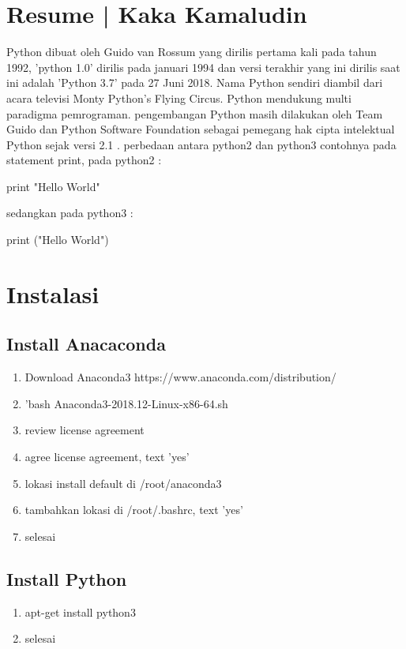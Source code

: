 \section{Resume | Kaka Kamaludin}
\begin{flushleft}
\qquad Python dibuat oleh Guido van Rossum yang dirilis pertama  kali pada tahun 1992, 'python 1.0' dirilis pada januari 1994 dan versi terakhir yang ini dirilis saat ini adalah 'Python 3.7' pada 27 Juni 2018. Nama Python sendiri diambil dari acara televisi Monty Python's Flying Circus. Python mendukung multi paradigma pemrograman. pengembangan Python masih dilakukan oleh Team Guido dan Python Software Foundation sebagai pemegang hak cipta intelektual Python sejak versi 2.1 . perbedaan antara python2 dan python3 contohnya pada statement print, pada python2 : 

print "Hello World"

sedangkan pada python3 :

print ("Hello World")
\end{flushleft}

\section{Instalasi}
\subsection{Install Anacaconda}
\begin{enumerate}
\item Download Anaconda3 https://www.anaconda.com/distribution/
\item 'bash Anaconda3-2018.12-Linux-x86-64.sh
\item review license agreement
\item agree license agreement, text 'yes'
\item lokasi install default di /root/anaconda3
\item tambahkan lokasi di /root/.bashrc, text 'yes'
\item selesai
\end{enumerate}

\subsection{Install Python}
\begin{enumerate}
\item apt-get install python3
\item selesai
\end{enumerate}

